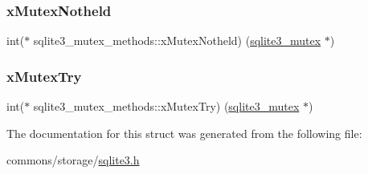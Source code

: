 \mbox{\label{structsqlite3__mutex__methods_a5b7c9daa7aea5f01ef9fa58f6d1c5cb1}} 
\subsubsection{\texorpdfstring{xMutexNotheld}{xMutexNotheld}}
{\footnotesize\ttfamily int($\ast$ sqlite3\+\_\+mutex\+\_\+methods\+::x\+Mutex\+Notheld) (\mbox{\hyperlink{sqlite3_8h_a0f546860bde03fddb33a9fed920da05c}{sqlite3\+\_\+mutex}} $\ast$)}

\mbox{\label{structsqlite3__mutex__methods_aa65a38cee32246dc3257a80ce47be5fe}} 
\subsubsection{\texorpdfstring{xMutexTry}{xMutexTry}}
{\footnotesize\ttfamily int($\ast$ sqlite3\+\_\+mutex\+\_\+methods\+::x\+Mutex\+Try) (\mbox{\hyperlink{sqlite3_8h_a0f546860bde03fddb33a9fed920da05c}{sqlite3\+\_\+mutex}} $\ast$)}



The documentation for this struct was generated from the following file\+:\begin{DoxyCompactItemize}
\item 
commons/storage/\mbox{\hyperlink{sqlite3_8h}{sqlite3.\+h}}\end{DoxyCompactItemize}
